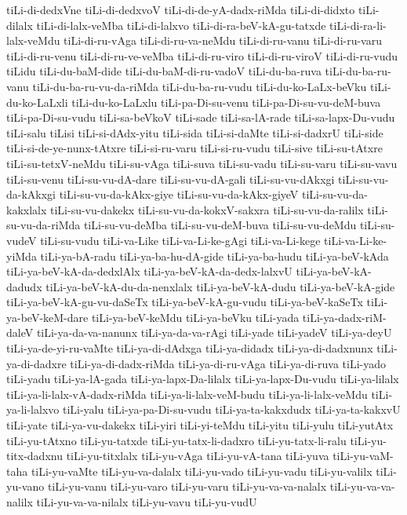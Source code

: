 {tiLi-di-dedxVne
tiLi-di-dedxvoV
tiLi-di-de-yA-dadx-riMda
tiLi-di-didxto
tiLi-dilalx
tiLi-di-lalx-veMba
tiLi-di-lalxvo
tiLi-di-ra-beV-kA-gu-tatxde
tiLi-di-ra-li-lalx-veMdu
tiLi-di-ru-vAga
tiLi-di-ru-va-neMdu
tiLi-di-ru-vanu
tiLi-di-ru-varu
tiLi-di-ru-venu
tiLi-di-ru-ve-veMba
tiLi-di-ru-viro
tiLi-di-ru-viroV
tiLi-di-ru-vudu
tiLidu
tiLi-du-baM-dide
tiLi-du-baM-di-ru-vadoV
tiLi-du-ba-ruva
tiLi-du-ba-ru-vanu
tiLi-du-ba-ru-vu-da-riMda
tiLi-du-ba-ru-vudu
tiLi-du-ko-LaLx-beVku
tiLi-du-ko-LaLxli
tiLi-du-ko-LaLxlu
tiLi-pa-Di-su-venu
tiLi-pa-Di-su-vu-deM-buva
tiLi-pa-Di-su-vudu
tiLi-sa-beVkoV
tiLi-sade
tiLi-sa-lA-rade
tiLi-sa-lapx-Du-vudu
tiLi-salu
tiLisi
tiLi-si-dAdx-yitu
tiLi-sida
tiLi-si-daMte
tiLi-si-dadxrU
tiLi-side
tiLi-si-de-ye-nunx-tAtxre
tiLi-si-ru-varu
tiLi-si-ru-vudu
tiLi-sive
tiLi-su-tAtxre
tiLi-su-tetxV-neMdu
tiLi-su-vAga
tiLi-suva
tiLi-su-vadu
tiLi-su-varu
tiLi-su-vavu
tiLi-su-venu
tiLi-su-vu-dA-dare
tiLi-su-vu-dA-gali
tiLi-su-vu-dAkxgi
tiLi-su-vu-da-kAkxgi
tiLi-su-vu-da-kAkx-giye
tiLi-su-vu-da-kAkx-giyeV
tiLi-su-vu-da-kakxlalx
tiLi-su-vu-dakekx
tiLi-su-vu-da-kokxV-sakxra
tiLi-su-vu-da-ralilx
tiLi-su-vu-da-riMda
tiLi-su-vu-deMba
tiLi-su-vu-deM-buva
tiLi-su-vu-deMdu
tiLi-su-vudeV
tiLi-su-vudu
tiLi-va-Like
tiLi-va-Li-ke-gAgi
tiLi-va-Li-kege
tiLi-va-Li-ke-yiMda
tiLi-ya-bA-radu
tiLi-ya-ba-hu-dA-gide
tiLi-ya-ba-hudu
tiLi-ya-beV-kAda
tiLi-ya-beV-kA-da-dedxlAlx
tiLi-ya-beV-kA-da-dedx-lalxvU
tiLi-ya-beV-kA-dadudx
tiLi-ya-beV-kA-du-da-nenxlalx
tiLi-ya-beV-kA-dudu
tiLi-ya-beV-kA-gide
tiLi-ya-beV-kA-gu-vu-daSeTx
tiLi-ya-beV-kA-gu-vudu
tiLi-ya-beV-kaSeTx
tiLi-ya-beV-keM-dare
tiLi-ya-beV-keMdu
tiLi-ya-beVku
tiLi-yada
tiLi-ya-dadx-riM-daleV
tiLi-ya-da-va-nanunx
tiLi-ya-da-va-rAgi
tiLi-yade
tiLi-yadeV
tiLi-ya-deyU
tiLi-ya-de-yi-ru-vaMte
tiLi-ya-di-dAdxga
tiLi-ya-didadx
tiLi-ya-di-dadxnunx
tiLi-ya-di-dadxre
tiLi-ya-di-dadx-riMda
tiLi-ya-di-ru-vAga
tiLi-ya-di-ruva
tiLi-yado
tiLi-yadu
tiLi-ya-lA-gada
tiLi-ya-lapx-Da-lilalx
tiLi-ya-lapx-Du-vudu
tiLi-ya-lilalx
tiLi-ya-li-lalx-vA-dadx-riMda
tiLi-ya-li-lalx-veM-budu
tiLi-ya-li-lalx-veMdu
tiLi-ya-li-lalxvo
tiLi-yalu
tiLi-ya-pa-Di-su-vudu
tiLi-ya-ta-kakxdudx
tiLi-ya-ta-kakxvU
tiLi-yate
tiLi-ya-vu-dakekx
tiLi-yiri
tiLi-yi-teMdu
tiLi-yitu
tiLi-yulu
tiLi-yutAtx
tiLi-yu-tAtxno
tiLi-yu-tatxde
tiLi-yu-tatx-li-dadxro
tiLi-yu-tatx-li-ralu
tiLi-yu-titx-dadxnu
tiLi-yu-titxlalx
tiLi-yu-vAga
tiLi-yu-vA-tana
tiLi-yuva
tiLi-yu-vaM-taha
tiLi-yu-vaMte
tiLi-yu-va-dalalx
tiLi-yu-vado
tiLi-yu-vadu
tiLi-yu-valilx
tiLi-yu-vano
tiLi-yu-vanu
tiLi-yu-varo
tiLi-yu-varu
tiLi-yu-va-va-nalalx
tiLi-yu-va-va-nalilx
tiLi-yu-va-va-nilalx
tiLi-yu-vavu
tiLi-yu-vudU
}
